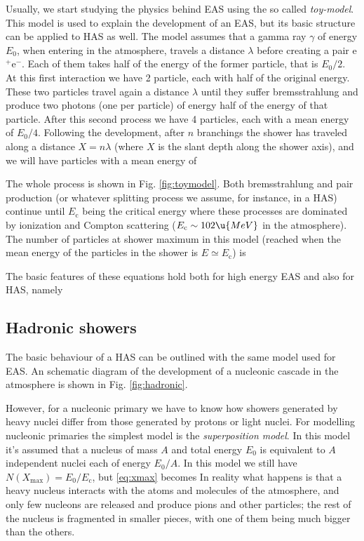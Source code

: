 Usually, we start studying the physics behind EAS using the so called
\emph{toy-model}. This model is used to explain the development of an
EAS, but its basic structure can be applied to HAS as well. The model
assumes that a gamma ray $\gamma$ of energy $E_0$, when entering in
the atmosphere, travels a distance $\lambda$ before creating a pair
e$^+$e$^-$. Each of them takes half of the energy of the former
particle, that is $E_0/2$. At this first interaction we have 2
particle, each with half of the original energy.  These two particles
travel again a distance $\lambda$ until they suffer bremsstrahlung and
produce two photons (one per particle) of energy half of the energy of
that particle. After this second process we have 4 particles, each
with a mean energy of $E_0/4$. Following the development, after $n$
branchings the shower has traveled along a distance $X=n\lambda$
(where $X$ is the slant depth along the shower axis), and we will have
%
\toyAeq
%
particles with a mean energy of
%
\toyBeq

The whole process is shown in Fig.  \ref{fig:toymodel}.  Both
bremsstrahlung and pair production (or whatever splitting process we
assume, for instance, in a HAS) continue until
%
\toyCeq
%
$E_{\mathrm{c}}$ being the critical energy where these processes are
dominated by ionization and Compton scattering ($E_{\mathrm{c}} \sim
102 \u{MeV}$ in the atmosphere). The number of particles at shower
maximum in this model (reached when the mean energy of the particles
in the shower is $E\simeq E_{\mathrm{c}}$) is
%
\toyDeq

\hadronicfig

The basic features of these equations hold both for high energy EAS
and also for HAS, namely
%
\NXsimpleeq

\subsection{Hadronic showers}

The basic behaviour of a HAS can be outlined with the same model used
for EAS. An schematic diagram of the development of a nucleonic
cascade in the atmosphere is shown in Fig. \ref{fig:hadronic}.

However, for a nucleonic primary we have to know how showers generated
by heavy nuclei differ from those generated by protons or light
nuclei. For modelling nucleonic primaries the simplest model is the
\emph{superposition model}. In this model it's assumed that a nucleus
of mass $A$ and total energy $E_0$ is equivalent to $A$ independent
nuclei each of energy $E_0/A$. In this model we still have
$N(X_{\mathrm{max}}) = E_0 / E_{\mathrm{c}}$, but \eqref{eq:xmax}
becomes
%
\NXsimpleHadeq
%
In reality what happens is that a heavy nucleus interacts with the
atoms and molecules of the atmosphere, and only few nucleons are
released and produce pions and other particles; the rest of the
nucleus is fragmented in smaller pieces, with one of them being much
bigger than the others. 

